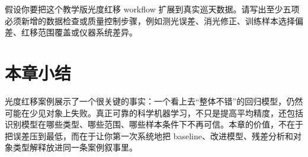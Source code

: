 \begin{exercisebox}[开放练习]
假设你要把这个教学版光度红移 workflow 扩展到真实巡天数据。请写出至少五项必须新增的数据检查或质量控制步骤，例如测光误差、消光修正、训练样本选择偏差、红移范围覆盖或仪器系统差异。
\end{exercisebox}

\section{本章小结}

光度红移案例展示了一个很关键的事实：一个看上去“整体不错”的回归模型，仍然可能在少见对象上失败。真正可靠的科学机器学习，不只是提高平均精度，还包括识别模型在哪些类型、哪些范围、哪些样本条件下不再可信。本章的价值，不在于把误差压到最低，而在于让你第一次系统地把 baseline、改进模型、残差分析和对象类型解释放进同一条案例叙事里。
